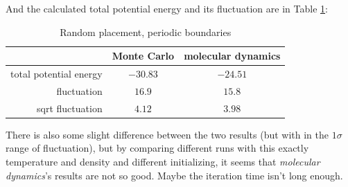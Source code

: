 \documentclass[UTF8,a4paper]{article}
\begin{document}
And the calculated total potential energy and its fluctuation are in Table \ref{tab:rand_p}:
\begin{table}[H]
	\centering
	\caption{Random placement, periodic boundaries}
	\begin{tabular}{rcc}
		\toprule
		\toprule
		                       & Monte Carlo & molecular dynamics \\ \midrule
		total potential energy & $-30.83$    & $-24.51$           \\
		fluctuation            & $16.9$      & $15.8$             \\
		sqrt fluctuation       & $4.12$      & $3.98$             \\
		\bottomrule
	\end{tabular}%
	\label{tab:rand_p}%
\end{table}%
There is also some slight difference between the two results (but with in the $1\sigma$ range of fluctuation), but by comparing different runs with this exactly temperature and density and different 
initializing, it seems that \textit{molecular dynamics}'s results are not so good. Maybe the iteration time isn't long enough.
\end{document}
